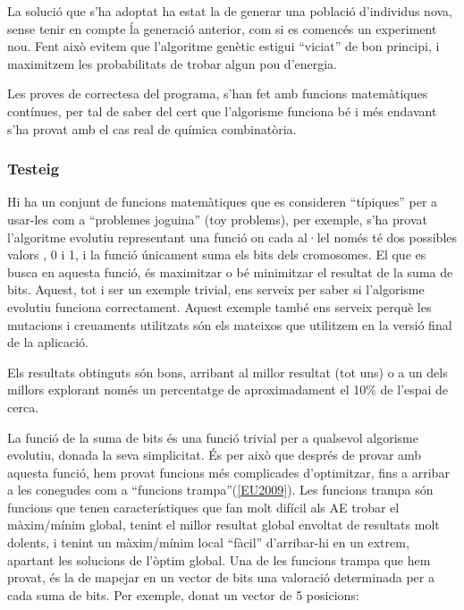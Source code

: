 La solució que s'ha adoptat ha estat la de generar una població d'individus
nova, sense tenir en compte ĺa generació anterior, com si es comencés un
experiment nou.  Fent això evitem que l'algoritme genètic estigui ``viciat'' de
bon principi, i maximitzem les probabilitats de trobar algun pou d'energia.

Les proves de correctesa del programa, s'han fet amb funcions matemàtiques
contínues, per tal de saber del cert que l'algorisme funciona bé i més endavant
s'ha provat amb el cas real de química combinatòria.


\subsubsection{Testeig} %
\label{ssub:Testeig}

Hi ha un conjunt de funcions matemàtiques que es consideren ``típiques'' per a
usar-les com a ``problemes joguina'' (toy problems), per exemple, s'ha provat
l'algoritme evolutiu representant una funció on cada al·lel només té dos
possibles valors , 0 i 1, i la funció únicament suma els bits dels cromosomes.
El que es busca en aquesta funció, és maximitzar o bé minimitzar el resultat de
la suma de bits.  Aquest, tot i ser un exemple trivial, ens serveix per
saber si l'algorisme evolutiu funciona correctament.  Aquest exemple també ens
serveix perquè les mutacions i creuaments utilitzats són els mateixos que
utilitzem en la versió final de la aplicació.

Els resultats obtinguts són bons, arribant al millor resultat (tot uns) o a un
dels millors explorant només un percentatge de aproximadament el  10\% de
l'espai de cerca.

La funció de la suma de bits és una funció trivial per a qualsevol algorisme
evolutiu, donada la seva simplicitat.  És per això que després de provar amb
aquesta funció, hem provat funcions més complicades d'optimitzar, fins a arribar a
les conegudes com a ``funcions trampa''(\ref{EU2009}).  Les funcions trampa són funcions que
tenen característiques que fan molt difícil als AE trobar el màxim/mínim global,
tenint el millor resultat global envoltat de resultats molt dolents, i tenint un
màxim/mínim local ``fàcil'' d'arribar-hi en un extrem, apartant les solucions de
l'òptim global.  Una de les funcions trampa que hem provat, és la de mapejar en
un vector de bits una valoració determinada per a cada suma de bits.  Per
exemple, donat un vector de 5 posicions:

